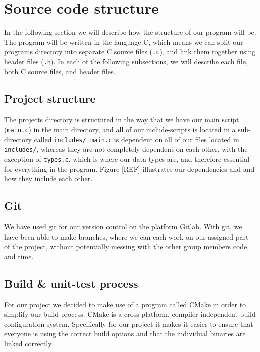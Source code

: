 \section{Source code structure}
In the following section we will describe how the structure of our program will be. The program will be written in the language C, which means we can split our programs directory into separate C source files (\verb|.c|), and link them together using header files (\verb|.h|). In each of the following subsections, we will describe each file, both C source files, and header files.

\subsection{Project structure}
The projects directory is structured in the way that we have our main script (\verb|main.c|) in the main directory, and all of our include-scripts is located in a sub-directory called \verb|includes/|. \verb|main.c| is dependent on all of our files located in \verb|includes/|, whereas they are not completely dependent on each other, with the exception of \verb|types.c|, which is where our data types are, and therefore essential for everything in the program. Figure [REF] illustrates our dependencies and and how they include each other.


\subsection{Git}
We have used git for our version control on the platform Gitlab. With git, we have been able to make branches, where we can each work on our assigned part of the project, without potentially messing with the other group members code, and time. 

\subsection{Build \& unit-test process}
For our project we decided to make use of a program called CMake in order to simplify our build process. CMake is a cross-platform, compiler independent build configuration system. Specifically for our project it makes it easier to ensure that everyone is using the correct build options and that the individual binaries are linked correctly.

